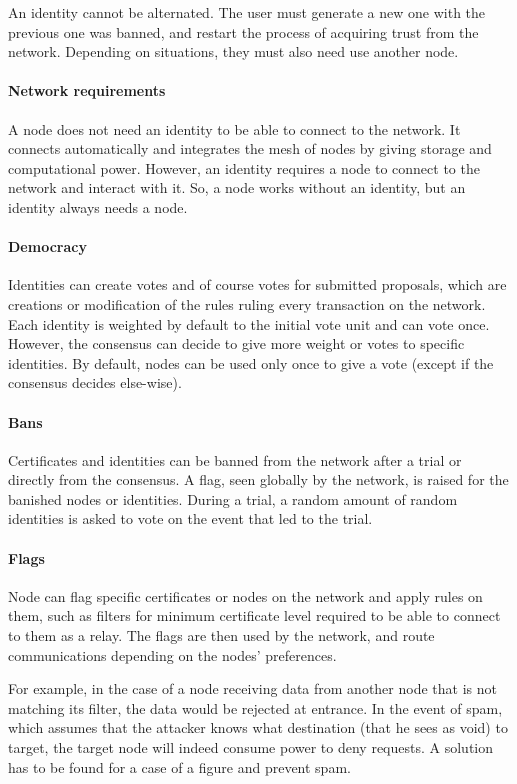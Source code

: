 An identity cannot be alternated. The user must generate a new one with the previous one was banned, and restart the process of acquiring trust from the network. Depending on situations, they must also need use another node.

\paragraph{Network requirements} A node does not need an identity to be able to connect to the network. It connects automatically and integrates the mesh of nodes by giving storage and computational power. However, an identity requires a node to connect to the network and interact with it. So, a node works without an identity, but an identity always needs a node.

\paragraph{Democracy} Identities can create votes and of course votes for submitted proposals, which are creations or modification of the rules ruling every transaction on the network. Each identity is weighted by default to the initial vote unit and can vote once. However, the consensus can decide to give more weight or votes to specific identities. By default, nodes can be used only once to give a vote (except if the consensus decides else-wise).

\paragraph{Bans} Certificates and identities can be banned from the network after a trial or directly from the consensus. A flag, seen globally by the network, is raised for the banished nodes or identities. During a trial, a random amount of random identities is asked to vote on the event that led to the trial.

\paragraph{Flags} Node can flag specific certificates or nodes on the network and apply rules on them, such as filters for minimum certificate level required to be able to connect to them as a relay. The flags are then used by the network, and route communications depending on the nodes' preferences.

For example, in the case of a node receiving data from another node that is not matching its filter, the data would be rejected at entrance. In the event of spam, which assumes that the attacker knows what destination (that he sees as void) to target, the target node will indeed consume power to deny requests. A solution has to be found for a case of a figure and prevent spam.

